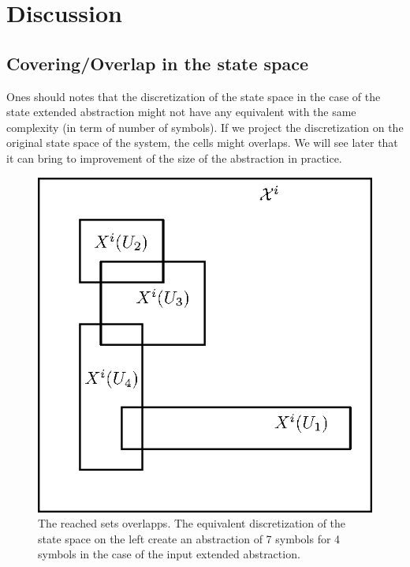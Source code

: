 \section{Discussion}
%

\subsection{Covering/Overlap in the state space}
Ones should notes that the discretization of the state space in the case of the state extended abstraction might not have any equivalent with the same complexity (in term of number of symbols).
If we project the discretization on the original state space of the system,  the cells might overlaps.
We will see later that it can bring to improvement of the size of the abstraction in practice.

\begin{figure}
\centering
\begin{minipage}[b]{0.49\textwidth}
	\includegraphics[width=\textwidth]{chapters/abstraction_reduction/overlapp_disc.eps}
\end{minipage}
\caption{The reached sets overlapps. The equivalent discretization of the state space on the left create an abstraction of 7 symbols for 4 symbols in the case of the input extended abstraction.}
\label{fig:overlapp}
\end{figure}

